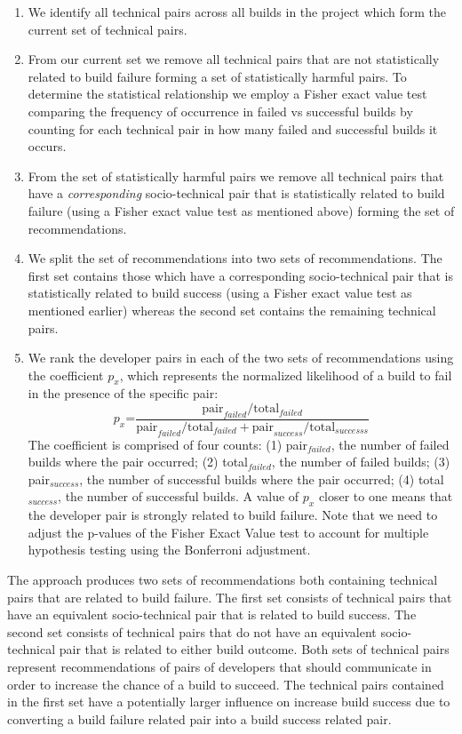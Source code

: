 \documentclass[conference]{IEEEtran}
\begin{document}
\begin{enumerate}
\item We identify all technical pairs across all builds in the project which form the current set of technical pairs.

\item From our current set we remove all technical pairs that are not statistically related to build failure forming a set of statistically harmful pairs. To determine the statistical relationship we employ a Fisher exact value test comparing the frequency of occurrence in failed vs successful builds by counting for each technical pair in how many failed and successful builds it occurs.

\item From the set of statistically harmful pairs we remove all technical pairs that have a \emph{corresponding} socio-technical pair that is statistically related to build failure (using a Fisher exact value test as mentioned above) forming the set of recommendations.

\item We split the set of recommendations into two sets of recommendations.
The first set contains those which have a corresponding socio-technical pair that is statistically related to build success (using a Fisher exact value test as mentioned earlier) whereas the second set contains the remaining technical pairs.

\item We rank the developer pairs in each of the two sets of recommendations using the coefficient $p_x$,
which represents the normalized likelihood of a build
to fail in the presence of the specific pair:
$$
p_x\text{=}\frac{ \text{pair}_{failed} / \text{total}_{failed} }
                     { \text{pair}_{failed} / \text{total}_{failed} + \text{pair}_{success} / \text{total}_{successs}}
$$
The coefficient is comprised of four counts: (1) pair$_{failed}$, the number of failed builds where the pair occurred; (2) total$_{failed}$, the number of failed builds; (3) pair$_{success}$, the number of successful builds where the pair occurred; (4) total$_{success}$, the number of successful builds.
A value of $p_x$ closer to one means that the developer pair is strongly related to build
failure. 
Note that we need to adjust the p-values of the Fisher Exact Value test to account for multiple hypothesis testing using the Bonferroni adjustment.
\end{enumerate}

The approach produces two sets of recommendations both containing technical pairs that are related to build failure.
The first set consists of technical pairs that have an equivalent socio-technical pair that is related to build success.
The second set consists of technical pairs that do not have an equivalent socio-technical pair that is related to either build outcome.
Both sets of technical pairs represent recommendations of pairs of developers that should communicate in order to increase the chance of a build to succeed. 
The technical pairs contained in the first set have a potentially larger influence on increase build success due to converting a build failure related pair into a build success related pair.
\end{document}
